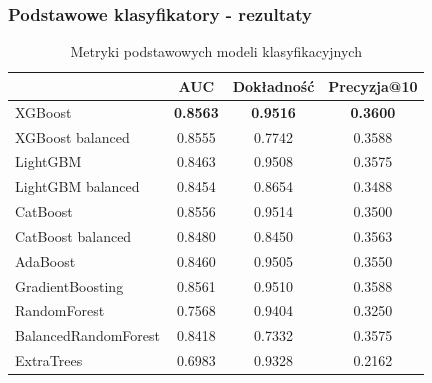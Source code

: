 \documentclass{beamer}
\begin{document}
    \begin{frame}
        \frametitle{Podstawowe klasyfikatory - rezultaty}
        \resizebo
        \begin{table}
            \begin{tabular}{l|*{3}{c}}
                & AUC & Dokładność & Precyzja@10 \\
                \hline
                XGBoost & \textbf{0.8563} & \textbf{0.9516} & \textbf{0.3600} \\
                XGBoost balanced & 0.8555 & 0.7742 & 0.3588 \\
                LightGBM & 0.8463 & 0.9508 & 0.3575 \\
                LightGBM balanced & 0.8454 & 0.8654 & 0.3488 \\
                CatBoost & 0.8556 & 0.9514 & 0.3500 \\
                CatBoost balanced & 0.8480 & 0.8450 & 0.3563 \\
                AdaBoost & 0.8460 & 0.9505 & 0.3550 \\
                GradientBoosting & 0.8561 & 0.9510 & 0.3588 \\
                RandomForest & 0.7568 & 0.9404 & 0.3250 \\
                BalancedRandomForest & 0.8418 & 0.7332 & 0.3575 \\
                ExtraTrees & 0.6983 & 0.9328 & 0.2162 \\
            \end{tabular}
            \caption{Metryki podstawowych modeli klasyfikacyjnych}
            \label{tab:score-comparison1}
        \end{table}
    \end{frame}
\end{document}
